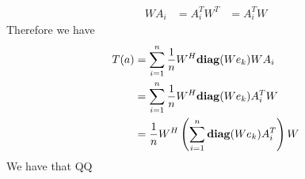 \begin{align*}
    WA_i&=A_i^TW^T
    &=A_i^TW
\end{align*}
Therefore we have 
\begin{align*}
    T(a)&=\sum_{i=1}^n\frac{1}{n}W^H\text{\textbf{diag}}(We_k)WA_i\\
    &=\sum_{i=1}^n\frac{1}{n}W^H\text{\textbf{diag}}(We_k)A_i^TW\\
    &=\frac{1}{n}W^H\left(\sum_{i=1}^n\text{\textbf{diag}}(We_k)A_i^T\right)W
\end{align*}
We have that     QQ



